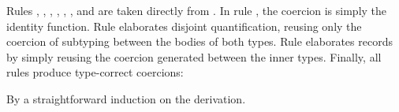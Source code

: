 Rules , , ,
, , , and
 are taken directly from \oldname.
In rule , the coercion is simply the identity function.
Rule  elaborates disjoint quantification, reusing only the coercion of 
subtyping between the bodies of both types. 
Rule  elaborates records by simply reusing the coercion generated between
the inner types.
Finally, all rules produce type-correct coercions:



{By a straightforward induction on the derivation.}



